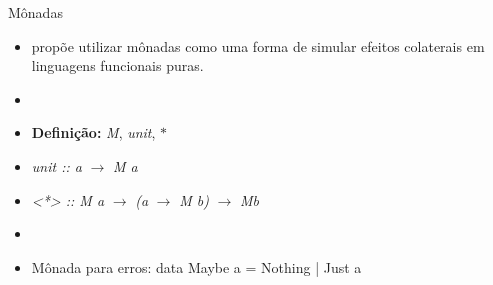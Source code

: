 \begin{frame}{Mônadas}
    \begin{itemize}
        \item {} propõe utilizar mônadas como uma forma de simular efeitos colaterais em linguagens funcionais puras.

        \item[] 
        
        \item \textbf{Definição:} \textit{M}, \textit{unit}, $*$

        \item [] \begin{center}
            \textit{unit :: a }$\rightarrow$\textit{ M a}\\
        \end{center}
        \item [] \begin{center}
            \textit{<*> :: M a }$\rightarrow$\textit{ (a }$\rightarrow$\textit{ M b) }$\rightarrow$\textit{ Mb}
        \end{center}

        \item[] 
        
        \item Mônada para erros: data Maybe a = Nothing | Just a
    \end{itemize}
\end{frame}